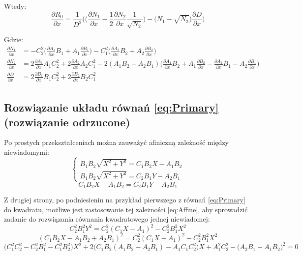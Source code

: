 \documentclass[10pt]{article}
\begin{document}
Wtedy:
\begin{equation}
\frac{\partial R_0}{\partial x} = \frac{1}{D^2}
\Bigg(
\bigg(
\frac{\partial N_1}{\partial x} -
\frac{1}{2} \frac{\partial N_2}{\partial x}
\frac{1}{\sqrt{N_2}}
\bigg) - 
\Big( N_1-\sqrt{N_2} \Big) \frac{\partial D}{\partial x}
\Bigg)
\end{equation}

Gdzie:
\begin{equation}
\begin{split}
\frac{\partial N_1}{\partial x} &=
-C_2^2 \bigg(\frac{\partial A_1}{\partial x} B_1 + A_1 \frac{\partial B_1}{\partial x} \bigg)
-C_1^2 \bigg(\frac{\partial A_2}{\partial x} B_2 + A_2 \frac{\partial B_2}{\partial x} \bigg) \\
\frac{\partial N_2}{\partial x} &= 
2\frac{\partial A_1}{\partial x} A_1 C_2^2 + 2\frac{\partial A_2}{\partial x} A_2 C_1^2 - 
2 ( A_1B_2 - A_2B_1)
\bigg(
\frac{\partial A_1}{\partial x} B_2 + A_1 \frac{\partial B_2}{\partial x} -
\frac{\partial A_2}{\partial x} B_1 - A_2 \frac{\partial B_1}{\partial x}
\bigg) \\
\frac{\partial D}{\partial x} &=
2\frac{\partial B_1}{\partial x} B_1 C_2^2 + 2\frac{\partial B_2}{\partial x} B_2 C_1^2 \\
\end{split}
\end{equation}

\newpage
\subsection*{Rozwiązanie układu równań \eqref{eq:Primary} (rozwiązanie odrzucone)}
Po prostych przekształceniach można zauważyć afiniczną zależność między niewiadomymi:
\begin{equation}
\begin{cases}
B_1 B_2 \sqrt{X^2 + Y^2} = C_1 B_2 X - A_1 B_2 \\ 
B_1 B_2 \sqrt{X^2 + Y^2} = C_2 B_1 Y - A_2 B_1
\end{cases}
\end{equation}
\begin{equation}
C_1 B_2 X - A_1 B_2 = C_2 B_1 Y - A_2 B_1
\label{eq:Affine}
\end{equation}

Z drugiej strony, po podniesieniu na przykład pierwszego z równań \eqref{eq:Primary} do kwadratu, możliwe jest zastosowanie tej zależności \eqref{eq:Affine}, aby sprowadzić zadanie do rozwiązania równania kwadratowego jednej niewiadomej:
\begin{equation}
C_2^2 B_1^2 Y^2 = C_2^2 (C_1 X - A_1)^2 - C_2^2 B_1^2 X^2
\end{equation}
\begin{equation}
(C_1 B_2 X - A_1 B_2 + A_2 B_1)^2 = C_2^2 (C_1 X - A_1)^2 - C_2^2 B_1^2 X^2
\end{equation}
\begin{equation}
\big(C_1^2 C_2^2 - C_2^2 B_1^2 - C_1^2 B_2^2 \big) X^2 + 
2\big(C_1B_2 (A_1B_2 - A_2B_1) - A_1C_1C_2^2 \big) X +
A_1^2 C_2^2 - \big(A_2B_1 - A_1B_2 \big)^2
 = 0
\end{equation}
\end{document}
